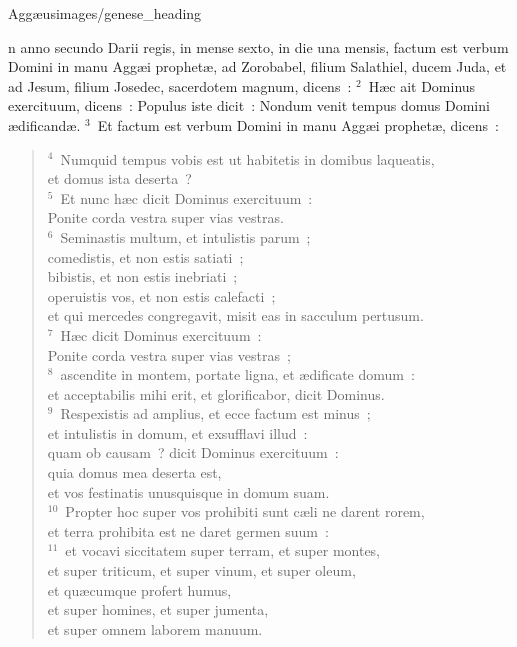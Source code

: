 {Aggæus}{images/genese_heading}


\bchapter
{}n anno secundo Darii regis, in mense sexto, in die una mensis, factum est verbum Domini in manu Agg\ae i prophet\ae , ad Zorobabel, filium Salathiel, ducem Juda, et ad Jesum, filium Josedec, sacerdotem magnum, dicens~:
${}^{2}$~H\ae c ait Dominus exercituum, dicens~: Populus iste dicit~: Nondum venit tempus domus Domini \ae dificand\ae .
${}^{3}$~Et factum est verbum Domini in manu Agg\ae i prophet\ae , dicens~:
\begin{verse}${}^{4}$~Numquid tempus vobis est ut habitetis in domibus laqueatis,\\ et domus ista deserta~?\\
${}^{5}$~Et nunc h\ae c dicit Dominus exercituum~:\\ Ponite corda vestra super vias vestras.\\
${}^{6}$~Seminastis multum, et intulistis parum~;\\ comedistis, et non estis satiati~;\\ bibistis, et non estis inebriati~;\\ operuistis vos, et non estis calefacti~;\\ et qui mercedes congregavit, misit eas in sacculum pertusum.\\
${}^{7}$~H\ae c dicit Dominus exercituum~:\\ Ponite corda vestra super vias vestras~;\\
${}^{8}$~ascendite in montem, portate ligna, et \ae dificate domum~:\\ et acceptabilis mihi erit, et glorificabor, dicit Dominus.\\
${}^{9}$~Respexistis ad amplius, et ecce factum est minus~;\\ et intulistis in domum, et exsufflavi illud~:\\ quam ob causam~? dicit Dominus exercituum~:\\ quia domus mea deserta est,\\ et vos festinatis unusquisque in domum suam.\\
${}^{10}$~Propter hoc super vos prohibiti sunt c\ae li ne darent rorem,\\ et terra prohibita est ne daret germen suum~:\\
${}^{11}$~et vocavi siccitatem super terram, et super montes,\\ et super triticum, et super vinum, et super oleum,\\ et qu\ae cumque profert humus,\\ et super homines, et super jumenta,\\ et super omnem laborem manuum.\end{verse}


